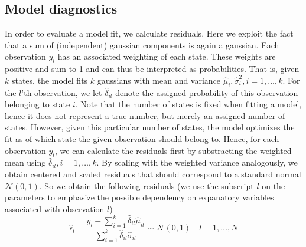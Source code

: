 \documentclass[9pt,twocolumn,twoside,lineno]{pnas-new}
\begin{document}
{ \subsection*{Model diagnostics}
In order to evaluate a model fit, we calculate residuals. Here we exploit the fact that a sum of (independent) gaussian components is again a gaussian. Each observation $y_l$ has an associated weighting of each state. These weights are positive and sum to 1 and can thus be interpreted as probabilities. That is, given $k$ states, the model fits $k$ gaussians with mean and variance $\hat{\mu}_i, \hat{\sigma}_i^2, i=1,\dots, k$. For the $l$'th observation, we let $\hat{\delta}_{il}$ denote the assigned probability of this observation belonging to state $i$. Note that the number of states is fixed when fitting a model, hence it does not represent a true number, but merely an assigned number of states. However, given this particular number of states, the model optimizes the fit as of which state the given observation should belong to.
Hence, for each observation $y_l$, we can calculate the residuals first by substracting the weighted mean using $\hat{\delta}_{il}, i=1,\dots,k$. By scaling with the weighted variance analogously, we obtain centered and scaled residuals that should correspond to a standard normal $\mathcal{N}(0,1)$. So we obtain the following residuals (we use the subscript $l$ on the parameters to emphasize the possible dependency on expanatory variables associated with observation $l$)
$$
  \hat{\epsilon}_l = \frac{y_l-\sum_{i=1}^k\hat{\delta}_{il}\hat{\mu}_{il} }{\sum_{i=1}^k\hat{\delta}_{il} \hat{\sigma}_{il}}\sim\mathcal{N}(0,1)\quad l=1,\dots,N
$$
}
\showmatmethods{} %

\showacknow{} %



\end{document}
